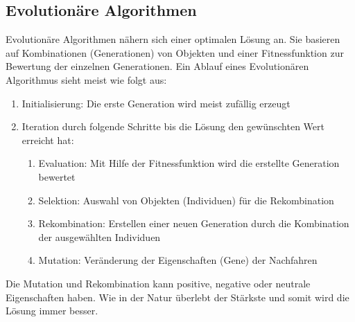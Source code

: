 \subsection{Evolutionäre Algorithmen}\label{ea_algos}
Evolutionäre Algorithmen nähern sich einer optimalen Lösung an. Sie basieren auf Kombinationen (Generationen) von Objekten und einer Fitnessfunktion zur Bewertung der einzelnen Generationen. Ein Ablauf eines Evolutionären Algorithmus sieht meist wie folgt aus:
\begin{enumerate}
	\item Initialisierung: Die erste Generation wird meist zufällig erzeugt
	\item Iteration durch folgende Schritte bis die Lösung den gewünschten Wert erreicht hat:
     	\begin{enumerate}
		\item Evaluation: Mit Hilfe der Fitnessfunktion wird die erstellte Generation bewertet
         		\item Selektion: Auswahl von Objekten (Individuen) für die Rekombination
         		\item Rekombination: Erstellen einer neuen Generation durch die Kombination der ausgewählten Individuen
         		\item Mutation: Veränderung der Eigenschaften (Gene) der Nachfahren
      	\end{enumerate}
\end{enumerate}
Die Mutation und Rekombination kann positive, negative oder neutrale Eigenschaften haben. Wie in der Natur überlebt der Stärkste und somit wird die Lösung immer besser.
